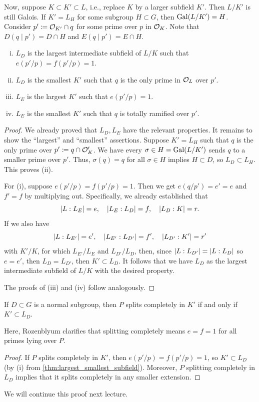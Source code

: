 Now, suppose $K \subset K' \subset L$, i.e., replace $K$ by a larger subfield $K'$. Then $L/K'$ is still Galois. If $K' = L_H$ for some subgroup $H \subset G$, then $\operatorname{Gal}(L/K') = H$. Consider $p' \coloneq \mathcal O_{K'} \cap q$ for some prime over $p$ in $\mathcal O_K$. Note that $D(q \mid p') = D \cap H$ and $E(q \mid p') = E \cap H$.

\begin{theorem} \label{thm:largest_smallest_subfield}
    \begin{enumerate}[(i)]
        \item $L_D$ is the largest intermediate subfield of $L/K$ such that $e(p' / p) = f(p' / p) = 1$.
        \item $L_D$ is the smallest $K'$ such that $q$ is the only prime in $\mathcal O_L$ over $p'$.
        \item $L_E$ is the largest $K'$ such that $e(p' / p) = 1$.
        \item $L_E$ is the smallest $K'$ such that $q$ is totally ramified over $p'$.
    \end{enumerate}
\end{theorem}

\newpage
\begin{proof}
    We already proved that $L_D, L_E$ have the relevant properties. It remains to show the ``largest'' and ``smallest'' assertions. Suppose $K' = L_H$ such that $q$ is the only prime over $p' \coloneq q \cap \mathcal O_K'$. We have every $\sigma \in H = \operatorname{Gal}(L/K')$ sends $q$ to a smaller prime over $p'$. Thus, $\sigma(q) = q$ for all $\sigma \in H$ implies $H \subset D$, so $L_D \subset L_H$. This proves (ii).

    For (i), suppose $e(p' / p) = f(p' / p) = 1$. Then we get $e(q / p') = e' = e$ and $f' = f$ by multiplying out. Specifically, we already established that
    \[ \left\lvert L : L_E \right\rvert = e, \quad \left\lvert L_E : L_D \right\rvert = f, \quad \left\lvert L_D : K \right\rvert = r. \]
    If we also have
    \[ \left\lvert L : L_{E'} \right\rvert = e', \quad \left\lvert L_{E'} : L_{D'} \right\rvert = f', \quad \left\lvert L_{D'} : K' \right\rvert = r' \]
    with $K' / K$, for which $L_{E'} / L_E$ and $L_{D'} / L_D$, then, since $\left\lvert L : L_{D'} \right\rvert = \left\lvert L : L_D \right\rvert$ so $e = e'$, then $L_D = L_{D'}$, then $K' \subset L_D$. It follows that we have $L_D$ as the largest intermediate subfield of $L/K$ with the desired property.

    The proofs of (iii) and (iv) follow analogously.
\end{proof}

\begin{corollary} \label{cor:prime_splits_completely_normal_subgroup_of_galois}
    If $D \subset G$ is a normal subgroup, then $P$ splits completely in $K'$ if and only if $K' \subset L_D$.
\end{corollary}
{\color{amethyst} Here, Rozenblyum clarifies that splitting completely means $e = f = 1$ for all primes lying over $P$.}
\begin{proof}
    If $P$ splits completely in $K'$, then $e(p' / p) = f(p' / p) = 1$, so $K' \subset L_D$ (by (i) from \ref{thm:largest_smallest_subfield}). Moreover, $P$ splitting completely in $L_D$ implies that it splits completely in any smaller extension.
\end{proof}

We will continue this proof next lecture.